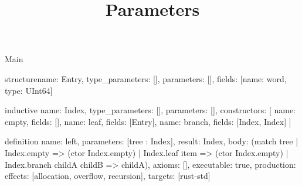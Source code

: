\begin{lexlean}{Main}
\title{Parameters}
\begin{semanticmodule}
structure{name: Entry, type_parameters: [], parameters: [], fields: [{name: word, type: UInt64}]}

inductive{
  name: Index,
  type_parameters: [],
  parameters: [],
  constructors: [
    {name: empty, fields: []},
    {name: leaf, fields: [Entry]},
    {name: branch, fields: [Index, Index]}
  ]
}

definition{
  name: left,
  parameters: [tree : Index],
  result: Index,
  body: (match tree
    | Index.empty => (ctor Index.empty)
    | Index.leaf item => (ctor Index.empty)
    | Index.branch childA childB => childA),
  axioms: [],
  executable: true,
  production: {effects: [allocation, overflow, recursion], targets: [rust-std]}
}
\end{semanticmodule}
\end{lexlean}
